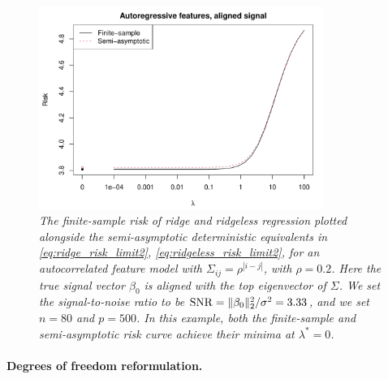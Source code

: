 \documentclass{article}
\begin{document}
\begin{figure}[tb]
\centering
\includegraphics[width=0.825\textwidth]{ridge_ar.pdf}
\caption{\it The finite-sample risk of ridge and ridgeless regression plotted
  alongside the semi-asymptotic deterministic equivalents in
  \eqref{eq:ridge_risk_limit2}, \eqref{eq:ridgeless_risk_limit2}, for an 
  autocorrelated feature model with $\Sigma_{ij} =  \rho^{|i-j|}$, with $\rho = 
  0.2$. Here the true signal vector $\beta_0$ is aligned with the top
  eigenvector of $\Sigma$. We set the signal-to-noise ratio to be $\mathrm{SNR} =
  \|\beta_0\|_2^2 / \sigma^2 = 3.33$, and we set $n = 80$ and $p = 500$. In this
  example, both the finite-sample and semi-asymptotic risk curve achieve their
  minima at $\lambda^* = 0$.}          
\label{fig:ridge_ar}
\end{figure}

\paragraph{Degrees of freedom reformulation.}
\end{document}
